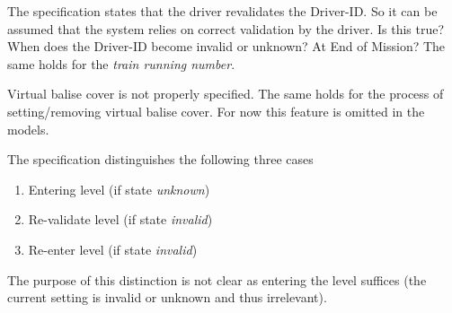 \documentclass{template/openetcs_article}
\begin{document}
The specification states that the driver revalidates the Driver-ID. So it can be assumed that the system relies on correct validation by the driver. Is this true? When does the Driver-ID become invalid or unknown? At End of Mission? The same holds for the \emph{train running number}.

Virtual balise cover is not properly specified. The same holds for the process of setting/removing virtual balise cover. For now this feature is omitted in the models.

The specification distinguishes the following three cases
\begin{enumerate}
   \item Entering level (if state \emph{unknown})
   \item Re-validate level (if state \emph{invalid})
   \item Re-enter level (if state \emph{invalid})
\end{enumerate}
The purpose of this distinction is not clear as entering the level suffices (the current setting is invalid or unknown and thus irrelevant).








\begin{thebibliography}{9}


\end{thebibliography}

\end{document}
